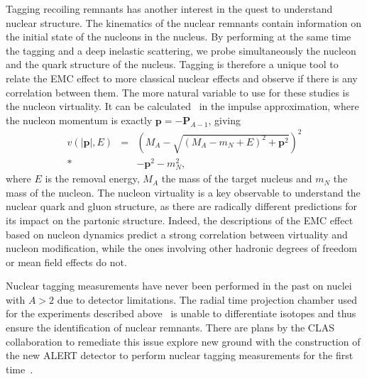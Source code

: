 Tagging recoiling remnants has another interest in the quest to understand nuclear structure.
The kinematics of the nuclear remnants contain information on the
initial state of the nucleons in the nucleus. By performing at the same time the 
tagging and a deep inelastic scattering, we probe simultaneously the nucleon and the 
quark structure of the nucleus. Tagging is therefore a unique tool to relate the EMC
effect to more classical nuclear effects and observe if there is any correlation between
them. The more natural variable to use for these studies is the nucleon virtuality.
It can be calculated~\cite{CiofidegliAtti:2007ork} in the impulse 
approximation, where the nucleon momentum is exactly $\mathbf{p} = -\mathbf{P}_{A-1}$, 
giving
\begin{eqnarray}
    v(|\mathbf{p}|, E) &  =  & \left (M_A - \sqrt{(M_A - m_N + E)^2 + \mathbf{p}^2} \right )^2  \\* \nonumber
                    & & -  \mathbf{p}^2 - m_N^2,
\end{eqnarray} 
where $E$ is the removal energy, $M_A$ the mass of the target nucleus
and $m_N$ the mass of the nucleon. The nucleon virtuality is a key 
observable to understand the nuclear quark and gluon structure,
as there are radically different predictions for its impact on the partonic structure.
Indeed, the descriptions of the EMC effect based on nucleon dynamics
predict a strong correlation between virtuality and nucleon modification,
while the ones involving other hadronic degrees of 
freedom or mean field effects do not. 

Nuclear tagging measurements have never been performed in the past
on nuclei with $A>2$ due to detector limitations. The radial time projection chamber used 
for the experiments described above~\cite{Baillie:2011za}
is unable to differentiate isotopes and thus ensure the identification of 
nuclear remnants. There are plans by the CLAS collaboration to remediate this issue
explore new ground with the construction of the new ALERT detector to perform nuclear tagging measurements 
for the first time~\cite{Armstrong:2017zqr,Armstrong:2017zcm}.

